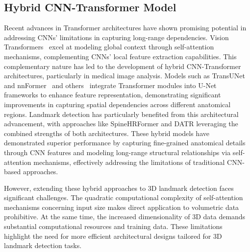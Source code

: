 \subsection{Hybrid CNN-Transformer Model}
Recent advances in Transformer architectures have shown promising potential in addressing CNNs' limitations in capturing long-range dependencies. Vision Transformers~\cite{VIT} excel at modeling global context through self-attention mechanisms, complementing CNNs' local feature extraction capabilities. This complementary nature has led to the development of hybrid CNN-Transformer architectures, particularly in medical image analysis. Models such as TransUNet~\cite{transunet} and nnFormer~\cite{nnformer} and others~\cite{MP-atten-hybrid2, MP-hybrid-2, MP-hybrid4, MP-hybrid5, MP-hybrid6, mp-CNN+ATTEn1, MP-atten-seg1, MP-U-atten3, MP-U-trans1, MP-U-trans2} integrate Transformer modules into U-Net frameworks to enhance feature representation, demonstrating significant improvements in capturing spatial dependencies across different anatomical regions. Landmark detection has particularly benefited from this architectural advancement, with approaches like SpineHRFormer \cite{SpineHRformer} and DATR \cite{DATR} leveraging the combined strengths of both architectures. These hybrid models have demonstrated superior performance by capturing fine-grained anatomical details through CNN features and modeling long-range structural relationships via self-attention mechanisms, effectively addressing the limitations of traditional CNN-based approaches.

However, extending these hybrid approaches to 3D landmark detection faces significant challenges. The quadratic computational complexity of self-attention mechanisms concerning input size makes direct application to volumetric data prohibitive. At the same time, the increased dimensionality of 3D data demands substantial computational resources and training data. These limitations highlight the need for more efficient architectural designs tailored for 3D landmark detection tasks.


